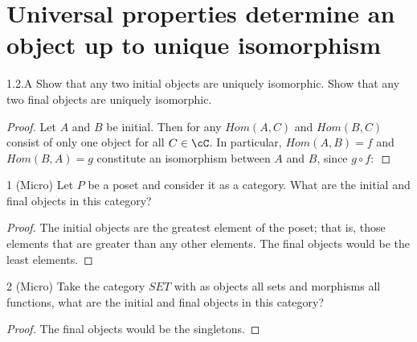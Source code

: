\section{Universal properties determine an object up to unique isomorphism}


\begin{exercise}{1.2.A}
Show that any two initial objects are uniquely isomorphic.
Show that any two final objects are uniquely isomorphic.
\end{exercise}
\begin{proof}
Let $A$ and $B$ be initial.
Then for any $Hom(A, C)$ and $Hom(B, C)$ consist of only one object for all $C \in \cC$.
In particular, $Hom(A, B) = f$ and $Hom(B, A) = g$ constitute an isomorphism between $A$ and $B$, since $g \circ f: $
\end{proof} 

\begin{exercise}{1 (Micro)}
Let $P$ be a poset and consider it as a category. 
What are the initial and final objects in this category?
\end{exercise}
\begin{proof}
The initial objects are the greatest element of the poset;
that is, those elements that are greater than any other elements.
The final objects would be the least elements.
\end{proof} 

\begin{exercise}{2 (Micro)}
Take the category $SET$ with as objects all sets and morphisms all functions, what are the initial and final objects in this category?
\end{exercise}
\begin{proof}
The final objects would be the singletons.
\end{proof} 
